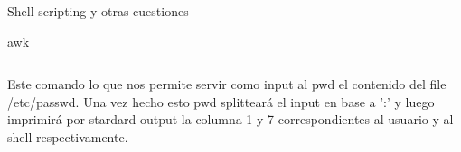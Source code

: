 \begin{section}{Shell scripting y otras cuestiones}
\begin{subsection}{awk}
\begin{itemize}
\begin{lstlisting}[style=Ubuntu]
\end{lstlisting}
Este comando lo que nos permite servir como input al pwd el contenido del file /etc/passwd. Una vez hecho esto pwd splitteará el input en base a ':' y luego imprimirá por stardard output la columna 1 y 7 correspondientes al usuario y al shell respectivamente.
\end{itemize}

\end{subsection}

\end{section}